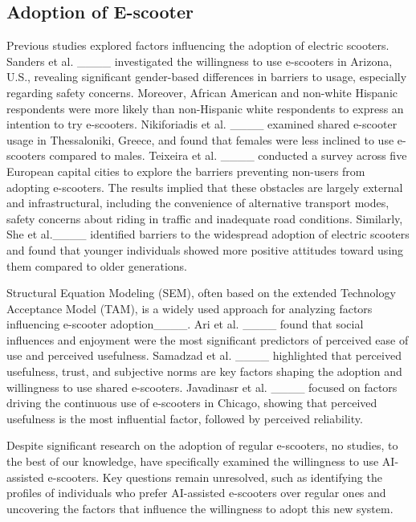 \subsection{Adoption of E-scooter}
Previous studies explored factors influencing the adoption of electric scooters. 
Sanders et al. ____ investigated the willingness to use e-scooters in Arizona, U.S., revealing significant gender-based differences in barriers to usage, especially regarding safety concerns. Moreover, African American and non-white Hispanic respondents were more likely than non-Hispanic white respondents to express an intention to try e-scooters. Nikiforiadis et al. ____ examined shared e-scooter usage in Thessaloniki, Greece, and found that females were less inclined to use e-scooters compared to males.
Teixeira et al. ____ conducted a survey across five European capital cities to explore the barriers preventing non-users from adopting e-scooters. The results implied that these obstacles are largely external and infrastructural, including the convenience of alternative transport modes, safety concerns about riding in traffic and inadequate road conditions. Similarly, She et al.____ identified barriers to the widespread adoption of electric scooters and found that younger individuals showed more positive attitudes toward using them compared to older generations.

Structural Equation Modeling (SEM), often based on the extended Technology Acceptance Model (TAM), is a widely used approach for analyzing factors influencing e-scooter adoption____. Ari et al. ____ found that social influences and enjoyment were the most significant predictors of perceived ease of use and perceived usefulness. Samadzad et al. ____ highlighted that perceived usefulness, trust, and subjective norms are key factors shaping the adoption and willingness to use shared e-scooters. Javadinasr et al. ____ focused on factors driving the continuous use of e-scooters in Chicago, showing that perceived usefulness is the most influential factor, followed by perceived reliability.

Despite significant research on the adoption of regular e-scooters, no studies, to the best of our knowledge, have specifically examined the willingness to use AI-assisted e-scooters. Key questions remain unresolved, such as identifying the profiles of individuals who prefer AI-assisted e-scooters over regular ones and uncovering the factors that influence the willingness to adopt this new system.


